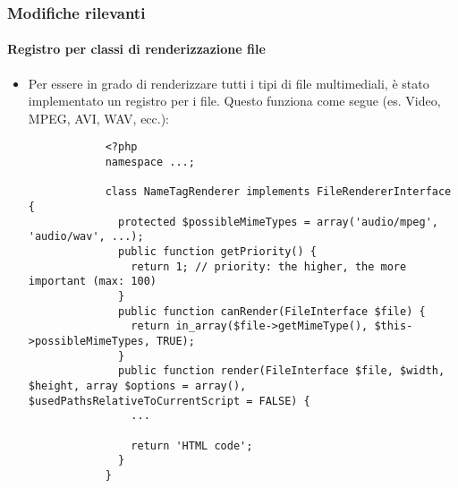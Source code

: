 
\begin{frame}[fragile]
	\frametitle{Modifiche rilevanti}
	\framesubtitle{Registro per classi di renderizzazione file}

	\lstset{
		basicstyle=\tiny\ttfamily
	}

	\begin{itemize}
		\item Per essere in grado di renderizzare tutti i tipi di file multimediali,
			è stato implementato un registro per i file.\newline
			Questo funziona come segue (es. Video, MPEG, AVI, WAV, ecc.):

		\begin{lstlisting}
			<?php
			namespace ...;

			class NameTagRenderer implements FileRendererInterface {
			  protected $possibleMimeTypes = array('audio/mpeg', 'audio/wav', ...);
			  public function getPriority() {
			    return 1; // priority: the higher, the more important (max: 100)
			  }
			  public function canRender(FileInterface $file) {
			    return in_array($file->getMimeType(), $this->possibleMimeTypes, TRUE);
			  }
			  public function render(FileInterface $file, $width, $height, array $options = array(), $usedPathsRelativeToCurrentScript = FALSE) {
			    ...

			    return 'HTML code';
			  }
			}
		\end{lstlisting}

	\end{itemize}

\end{frame}


